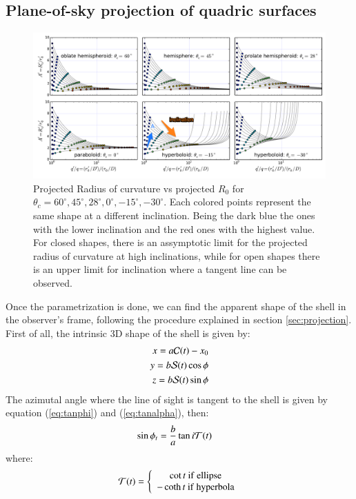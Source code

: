 \subsection{Plane-of-sky projection of quadric surfaces} 
\begin{figure}
\includegraphics[width=0.9\linewidth]{annotated}
\caption{Projected Radius of curvature vs projected $R_0$ for $\theta_c=60^\circ,45^\circ,28^\circ, 0^\circ,-15^\circ,-30^\circ$. Each colored points represent
the same shape at a different inclination. Being the dark blue the ones with the lower inclination and the red ones with the highest value. For closed shapes, there is
an assymptotic limit for the projected radius of curvature at high inclinations, while for open shapes there is an upper limit for inclination where a tangent line can be observed.}
\label{fig:Apqp}
\end{figure}

Once the parametrization is done, we can find the apparent shape of
the shell in the observer's frame, following the procedure explained
in section \ref{sec:projection}.  First of all, the intrinsic 3D shape of the shell is given by:
\begin{align}
x = a\mathcal{C}(t)-x_0 \\ 
y = b\mathcal{S}(t)\cos\phi \\
z =  b\mathcal{S}(t)\sin\phi
\end{align}
The azimutal angle where the line of sight is tangent to the shell is given by equation (\ref{eq:tanphi}) and (\ref{eq:tanalpha}), then:
\begin{align}
\sin\phi_t &= \frac{b}{a}\tan i\mathcal{T}(t) 
\end{align}
where:
\begin{align}
\mathcal{T}(t) = \left\lbrace \begin{array}{c}
\cot t ~\mathrm{if~ellipse} \\
-\coth t ~\mathrm{if~hyperbola}
\end{array}\right.
\end{align}


